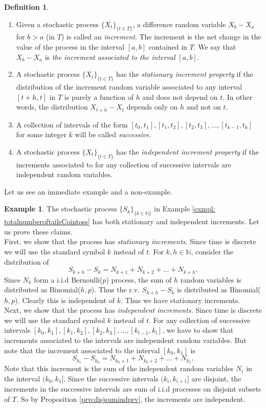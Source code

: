 \documentclass[letterpaper, 12pt]{article}
\newcommand{\1}{\mathds{1}} %
\theoremstyle{definition}
\newtheorem{definition}[theorem]{Definition}
\newtheorem{example}[theorem]{Example}
\begin{document}
\begin{definition}
\,
  \begin{enumerate}
  \item Given a stochastic process $\{X_t\}_{\{t \in T\}}$, a difference random variable $X_b - X_a$ for $b > a$ (in $T$) is called an \emph{increment}. The increment is the net change in the value of the process in the interval $[a,b]$ contained in $T$. We say that $X_b - X_a$ is \emph{the increment associated to the interval} $[a,b]$.
  \item A stochastic process $\{X_t\}_{\{t \in T\}}$ has the \emph{stationary increment property} if the distribution of the increment random variable associated to any interval $[t+h,t]$ in $T$ is purely a function of $h$ and does not depend on $t$. In other words, the distribution $X_{t+h} - X_t$ depends only on $h$ and not on $t$.
  \item A collection of intervals of the form $[t_0,t_1], [t_1,t_2], [t_2,t_3],\ldots, [t_{k-1},t_k]$ for some integer $k$ will be called \emph{successive}.  
  \item A stochastic process $\{X_t\}_{\{t \in T\}}$ has the \emph{independent increment property} if the increments associated to for any collection of successive intervals are independent random variables.
  \end{enumerate}
\end{definition}

Let us see an immediate example and a non-example.

\begin{example}
  The stochastic process $\{S_k\}_{\{k \in \mathbb{N}\}}$ in Example \ref{exmpl: totalnumberoftailsCointoss} has both stationary and independent increments. Let us prove these claims.\\
  First, we show that the process has \emph{stationary increments.} Since time is discrete we will use the standard symbol $k$ instead of $t$. For $k,h \in \mathbb{N}$, consider the distribution of $$S_{k+h} - S_k = N_{k+1} + N_{k+2} + \ldots + N_{k+h}.$$ Since $N_k$ form a i.i.d Bernoulli($p$) process, the sum of $h$ random variables is distributed as Binomial($h,p$). Thus the r.v. $S_{k+h} - S_k$ is distributed as Binomial($h,p$). Clearly this is independent of $k$. Thus we have stationary increments.\\
  Next, we show that the process has \emph{independent increments.} Since time is discrete we will use the standard symbol $k$ instead of $t$. For any collection of successive intervals $[k_0,k_1], [k_1,k_2], [k_2,k_3],\ldots, [k_{l-1},k_l]$, we have to show that increments associated to the intervals are independent random variables. But note that the increment associated to the interval $[k_0,k_1]$ is \[S_{k_1} - S_{k_0} = N_{k_0+1} + N_{k_0+2} + \ldots + N_{k_1}.\] Note that this increment is the sum of the independent random variables $N_i$ in the interval $(k_0,k_1]$. Since the successive intervals $(k_i,k_{i+1}]$ are disjoint, the increments in the successive intervals are sum of i.i.d processes on disjoint subsets of $T$. So by Proposition \ref{prp:disjsumindprv}, the increments are independent. 
\end{example}
\end{document}

